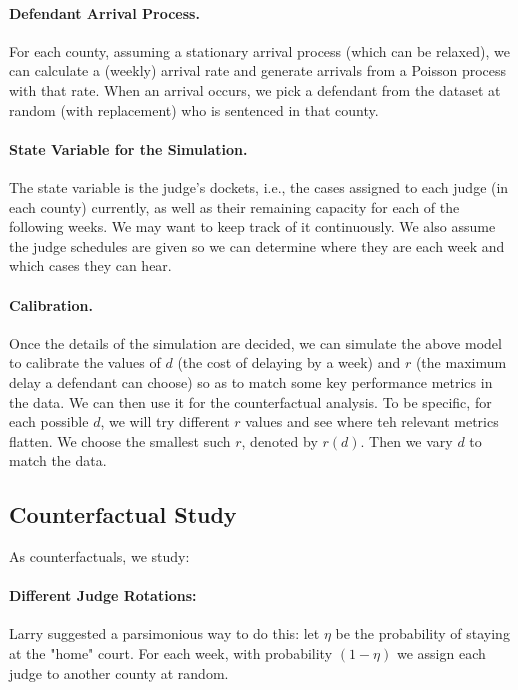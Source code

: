 \documentclass[11pt, oneside]{article}   	%
\theoremstyle{ModifiedStyle}
\begin{document}
		\vspace{-1mm}
		\paragraph{Defendant Arrival Process.} For each county, assuming a stationary arrival process (which can be relaxed), we can calculate a (weekly) arrival rate and generate arrivals from a Poisson process with that rate. When an arrival occurs, we pick a defendant from the dataset at random (with replacement) who is sentenced in that county.
		\vspace{-3mm}
		\paragraph{State Variable for the Simulation.} The state variable is the judge's dockets, i.e., the cases assigned to each judge (in each county) currently, as well as their remaining capacity for each of the following weeks. We may want to keep track of it continuously. We also assume the judge schedules are given so we can determine where they are each week and which cases they can hear.


		\vspace{-3mm}
		\paragraph{Calibration.} Once the details of the simulation are decided, we can simulate the above model to calibrate the values of $d$ (the cost of delaying by a week) and $r$ (the maximum delay a defendant can choose) so as to match some key performance metrics in the data. We can then use it for the counterfactual analysis. To be specific, for each possible $d$, we will try different $r$ values and see where teh relevant metrics flatten. We choose the smallest such $r$, denoted by $r(d)$. Then we vary $d$ to match the data.



	\subsection{Counterfactual Study}
		As counterfactuals, we study:

		\paragraph{Different Judge Rotations:} Larry suggested a parsimonious way to do this: let $\eta$ be the probability of staying at the "home" court. For each week, with probability $(1-\eta)$ we assign each judge to another county at random.
\end{document}
